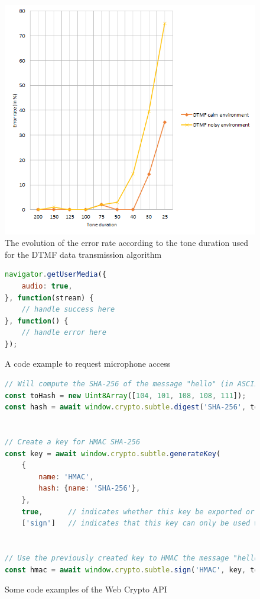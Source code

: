 \documentclass[twocolumn,14pt]{extarticle}
\begin{document}
\begin{figure}[!ht]
\begin{center}
\includegraphics[width=1\textwidth]{figure/dtmf-graph.png}
\caption{The evolution of the error rate according to the tone duration used for the DTMF data transmission algorithm}
\label{appendix:fig:dtmfgraph}
\end{center}
\end{figure}

\begin{figure}[!ht]
\begin{lstlisting}[language=JavaScript]
navigator.getUserMedia({
    audio: true,
}, function(stream) {
    // handle success here
}, function() {
    // handle error here
});
\end{lstlisting}
\caption{A code example to request microphone access}
\label{appendix:fig:requestmicro}
\end{figure}

\begin{figure}[!ht]
\begin{lstlisting}[language=JavaScript]
// Will compute the SHA-256 of the message "hello" (in ASCII)
const toHash = new Uint8Array([104, 101, 108, 108, 111]);
const hash = await window.crypto.subtle.digest('SHA-256', toHash);


// Create a key for HMAC SHA-256
const key = await window.crypto.subtle.generateKey(
	{
		name: 'HMAC',
		hash: {name: 'SHA-256'},
	},
	true,      // indicates whether this key be exported or not
	['sign']   // indicates that this key can only be used with the sign function
	
	
// Use the previously created key to HMAC the message "hello" (in ASCII)
const hmac = await window.crypto.subtle.sign('HMAC', key, toHash);
\end{lstlisting}
\caption{Some code examples of the Web Crypto API}
\label{appendix:fig:cryptoapiex}
\end{figure}
\end{document}
